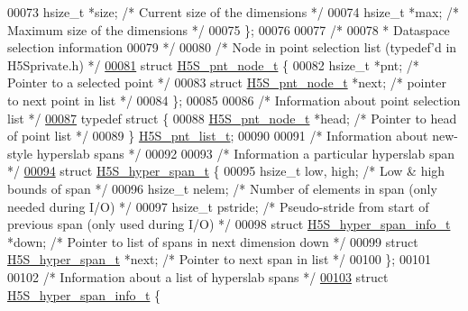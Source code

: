 \begin{DoxyCode}
00073     hsize\_t *size;              \textcolor{comment}{/* Current size of the dimensions */}
00074     hsize\_t *max;               \textcolor{comment}{/* Maximum size of the dimensions */}
00075 \};
00076 
00077 \textcolor{comment}{/*}
00078 \textcolor{comment}{ * Dataspace selection information}
00079 \textcolor{comment}{ */}
00080 \textcolor{comment}{/* Node in point selection list (typedef'd in H5Sprivate.h) */}
\hyperlink{struct_h5_s__pnt__node__t}{00081} \textcolor{keyword}{struct }\hyperlink{struct_h5_s__pnt__node__t}{H5S\_pnt\_node\_t} \{
00082     hsize\_t *pnt;          \textcolor{comment}{/* Pointer to a selected point */}
00083     \textcolor{keyword}{struct }\hyperlink{struct_h5_s__pnt__node__t}{H5S\_pnt\_node\_t} *next;  \textcolor{comment}{/* pointer to next point in list */}
00084 \};
00085 
00086 \textcolor{comment}{/* Information about point selection list */}
\hyperlink{struct_h5_s__pnt__list__t}{00087} \textcolor{keyword}{typedef} \textcolor{keyword}{struct }\{
00088     \hyperlink{struct_h5_s__pnt__node__t}{H5S\_pnt\_node\_t} *head;   \textcolor{comment}{/* Pointer to head of point list */}
00089 \} \hyperlink{struct_h5_s__pnt__list__t}{H5S\_pnt\_list\_t};
00090 
00091 \textcolor{comment}{/* Information about new-style hyperslab spans */}
00092 
00093 \textcolor{comment}{/* Information a particular hyperslab span */}
\hyperlink{struct_h5_s__hyper__span__t}{00094} \textcolor{keyword}{struct }\hyperlink{struct_h5_s__hyper__span__t}{H5S\_hyper\_span\_t} \{
00095     hsize\_t low, high;          \textcolor{comment}{/* Low & high bounds of span */}
00096     hsize\_t nelem;              \textcolor{comment}{/* Number of elements in span (only needed during I/O) */}
00097     hsize\_t pstride;            \textcolor{comment}{/* Pseudo-stride from start of previous span (only used during I/O) */}
00098     \textcolor{keyword}{struct }\hyperlink{struct_h5_s__hyper__span__info__t}{H5S\_hyper\_span\_info\_t} *down;     \textcolor{comment}{/* Pointer to list of spans in next
       dimension down */}
00099     \textcolor{keyword}{struct }\hyperlink{struct_h5_s__hyper__span__t}{H5S\_hyper\_span\_t} *next;     \textcolor{comment}{/* Pointer to next span in list */}
00100 \};
00101 
00102 \textcolor{comment}{/* Information about a list of hyperslab spans */}
\hyperlink{struct_h5_s__hyper__span__info__t}{00103} \textcolor{keyword}{struct }\hyperlink{struct_h5_s__hyper__span__info__t}{H5S\_hyper\_span\_info\_t} \{

\end{DoxyCode}
